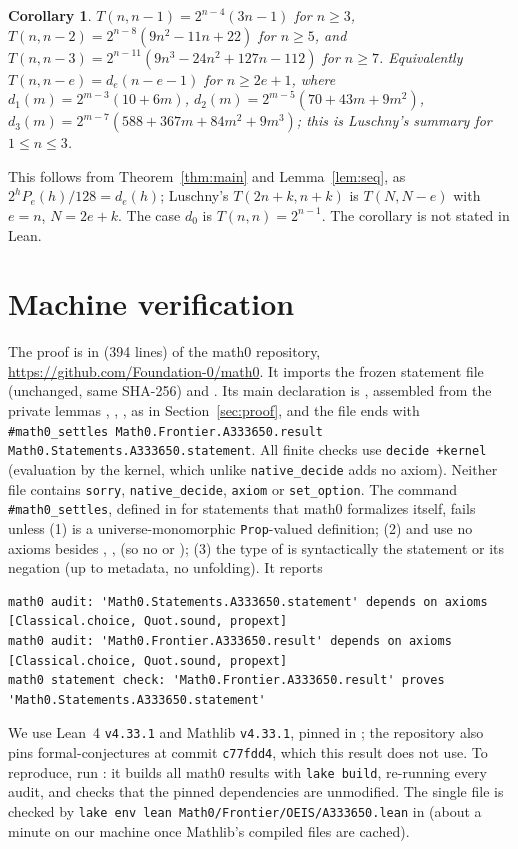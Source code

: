 \documentclass[11pt]{amsart}
\theoremstyle{plain}
\newtheorem{corollary}[theorem]{Corollary}
\theoremstyle{definition}
\begin{document}
\begin{corollary}\label{cor:closed}
$T(n,n-1)=2^{n-4}(3n-1)$ for $n\ge3$, $T(n,n-2)=2^{n-8}(9n^2-11n+22)$ for $n\ge5$, and $T(n,n-3)=2^{n-11}(9n^3-24n^2+127n-112)$ for $n\ge7$. Equivalently $T(n,n-e)=d_e(n-e-1)$ for $n\ge2e+1$, where $d_1(m)=2^{m-3}(10+6m)$, $d_2(m)=2^{m-5}(70+43m+9m^2)$, $d_3(m)=2^{m-7}(588+367m+84m^2+9m^3)$; this is Luschny's summary for $1\le n\le 3$.
\end{corollary}
This follows from Theorem~\ref{thm:main} and Lemma~\ref{lem:seq}, as $2^hP_e(h)/128=d_e(h)$; Luschny's $T(2n+k,n+k)$ is $T(N,N-e)$ with $e=n$, $N=2e+k$. The case $d_0$ is $T(n,n)=2^{n-1}$. The corollary is not stated in Lean.

\section{Machine verification}\label{sec:lean}

The proof is in  (394 lines) of the math0 repository, \url{https://github.com/Foundation-0/math0}. It imports the frozen statement file (unchanged, same SHA-256) and . Its main declaration is , assembled from the private lemmas , , ,  as in Section~\ref{sec:proof}, and the file ends with \texttt{\#math0\_settles Math0.Frontier.A333650.result Math0.Statements.A333650.statement}. All finite checks use \texttt{decide +kernel} (evaluation by the kernel, which unlike \texttt{native\_decide} adds no axiom). Neither file contains \texttt{sorry}, \texttt{native\_decide}, \texttt{axiom} or \texttt{set\_option}.
The command \texttt{\#math0\_settles}, defined in  for statements that math0 formalizes itself, fails unless (1)  is a universe-monomorphic \texttt{Prop}-valued definition; (2)  and  use no axioms besides , ,  (so no  or ); (3) the type of  is syntactically the statement or its negation (up to metadata, no unfolding). It reports
\begin{lstlisting}[basicstyle=\ttfamily\scriptsize]
math0 audit: 'Math0.Statements.A333650.statement' depends on axioms [Classical.choice, Quot.sound, propext]
math0 audit: 'Math0.Frontier.A333650.result' depends on axioms [Classical.choice, Quot.sound, propext]
math0 statement check: 'Math0.Frontier.A333650.result' proves 'Math0.Statements.A333650.statement'
\end{lstlisting}
We use Lean~4 \cite{Lean4} \texttt{v4.33.1} and Mathlib \cite{Mathlib} \texttt{v4.33.1}, pinned in ; the repository also pins formal-conjectures \cite{FC} at commit \texttt{c77fdd4}, which this result does not use.
To reproduce, run : it builds all math0 results with \texttt{lake build}, re-running every audit, and checks that the pinned dependencies are unmodified. The single file is checked by \texttt{lake env lean Math0/Frontier/OEIS/A333650.lean} in  (about a minute on our machine once Mathlib's compiled files are cached).
\end{document}
